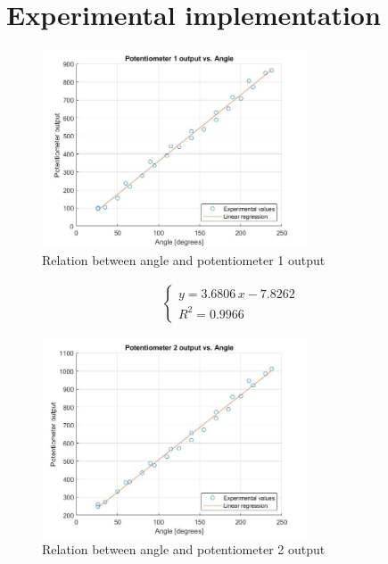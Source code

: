 \section{Experimental implementation}
\label{sec:experimental}



\begin{figure}[H]
    \centering
    \includegraphics[width=0.7\textwidth]{figures/pot1.jpg}
    \caption{Relation between angle and potentiometer 1 output}
    \label{fig:pot1}
\end{figure}

\begin{align*}
    \begin{cases}
        y = 3.6806\,x  - 7.8262 \\
        R^2 = 0.9966
    \end{cases}
\end{align*}

\begin{figure}[H]
    \centering
    \includegraphics[width=0.7\textwidth]{figures/pot2.jpg}
    \caption{Relation between angle and potentiometer 2 output}
    \label{fig:pot2}
\end{figure}

